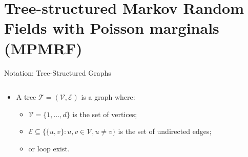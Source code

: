 \documentclass[11pt,xcolor={dvipsnames},hyperref={pdftex,pdfpagemode=UseNone,hidelinks,pdfdisplaydoctitle=true},usepdftitle=false]{beamer}
\begin{document}
\section{Tree-structured Markov Random Fields with Poisson marginals (MPMRF)}
\begin{frame}{Notation: Tree-Structured Graphs}
\begin{columns}
    \begin{column}{0.6\textwidth}
        \begin{itemize}
            \item A tree $\mathcal{T}=(\mathcal{V},\mathcal{E})$ is a graph where:
            \begin{itemize}
                \item $\mathcal{V}=\{1,\ldots,d\}$ is the set of vertices;
            \item $\mathcal{E} \subseteq \{\{u,v\} : u,v \in \mathcal{V}, u \neq v\}$ is the set of undirected edges;
            \item {} or loop exist.
            \end{itemize}
            \vfill
        \end{itemize}
    \end{column}
    \begin{column}{0.4\textwidth}
    
    \end{column}
\end{columns}
\end{frame}
\end{document}
